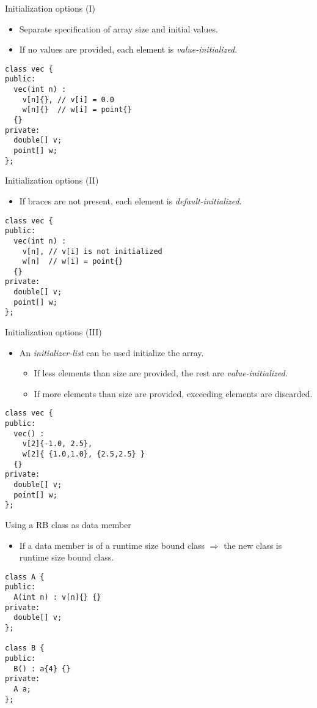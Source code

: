 \begin{frame}[t,fragile]{Initialization options (I)}
  \begin{itemize}
    \item Separate specification of array size and initial values.
    \item If no values are provided, each element is \emph{value-initialized}.
  \end{itemize}
\begin{lstlisting}[style=cpp11]
class vec {
public:
  vec(int n) : 
    v[n]{}, // v[i] = 0.0
    w[n]{}  // w[i] = point{}
  {}
private:
  double[] v;
  point[] w;
};
\end{lstlisting}
\end{frame}

\begin{frame}[t,fragile]{Initialization options (II)}
  \begin{itemize}
    \item If braces are not present, each element is \emph{default-initialized}.
  \end{itemize}
\begin{lstlisting}[style=cpp11]
class vec {
public:
  vec(int n) : 
    v[n], // v[i] is not initialized
    w[n]  // w[i] = point{}
  {}
private:
  double[] v;
  point[] w;
};
\end{lstlisting}
\end{frame}

\begin{frame}[t,fragile]{Initialization options (III)}
  \begin{itemize}
    \item An \emph{initializer-list} can be used initialize the array.
      \begin{itemize}
        \item If less elements than size are provided, the rest are \emph{value-initialized}.
        \item If more elements than size are provided, exceeding elements are discarded.
      \end{itemize}
  \end{itemize}
\begin{lstlisting}[style=cpp11]
class vec {
public:
  vec() : 
    v[2]{-1.0, 2.5}, 
    w[2]{ {1.0,1.0}, {2.5,2.5} }
  {}
private:
  double[] v;
  point[] w;
};
\end{lstlisting}
\end{frame}

\begin{frame}[t,fragile]{Using a RB class as data member}
  \begin{itemize}
    \item If a data member is of a runtime size bound class $\Rightarrow$ the new class is runtime size bound class.
  \end{itemize}
\begin{lstlisting}[style=cpp11]
class A {
public:
  A(int n) : v[n]{} {}
private:
  double[] v;
};

class B {
public:
  B() : a{4} {}
private:
  A a;
};
\end{lstlisting}
\end{frame}

